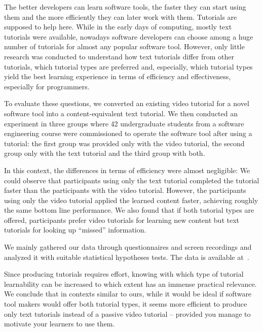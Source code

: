 The better developers can learn software tools, the faster they can start using them and the more efficiently they can later work with them. Tutorials are supposed to help here. While in the early days of computing, mostly text tutorials were available, nowadays software developers can choose among a huge number of tutorials for almost any popular software tool. However, only little research was conducted to understand how text tutorials differ from other tutorials, which tutorial types are preferred and, especially, which tutorial types yield the best learning experience in terms of efficiency and effectiveness, especially for programmers.

To evaluate these questions, we converted an existing video tutorial for a novel software tool into a content-equivalent text tutorial. We then conducted an experiment in three groups where 42 undergraduate students from a software engineering course were commissioned to operate the software tool after using a tutorial: the first group was provided only with the video tutorial, the second group only with the text tutorial and the third group with both. 

In this context, the differences in terms of efficiency were almost negligible: We could observe that participants using only the text tutorial completed the tutorial faster than the participants with the video tutorial. However, the participants using only the video tutorial applied the learned content faster, achieving roughly the same bottom line performance. We also found that if both tutorial types are offered, participants prefer video tutorials for learning new content but text tutorials for looking up \enquote{missed} information.

We mainly gathered our data through questionnaires and screen recordings and analyzed it with suitable statistical hypotheses tests. The data is available at~\cite{kulesz_daniel_2016_188896}. 

Since producing tutorials requires effort, knowing with which type of tutorial learnability can be increased to which extent has an immense practical relevance. We conclude that in contexts similar to ours, while it would be ideal if software tool makers would offer both tutorial types, it seems more efficient to produce only text tutorials instead of a passive video tutorial -- provided you manage to motivate your learners to use them.
